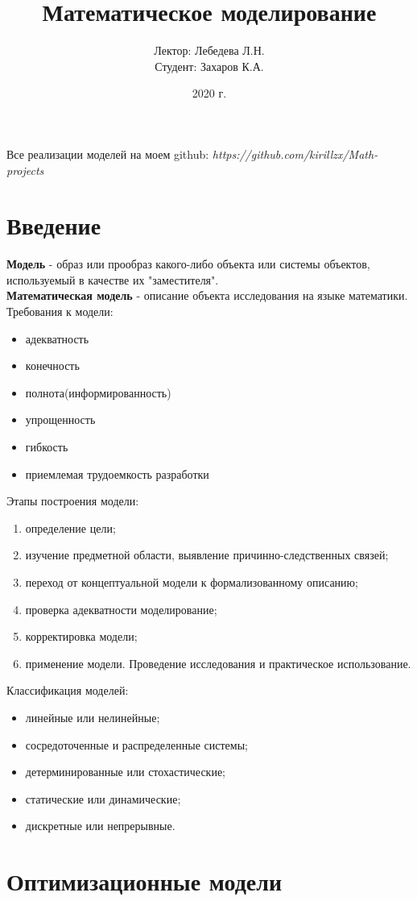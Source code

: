 \documentclass[12pt]{article}
\title{Математическое моделирование}
\author{Лектор: Лебедева Л.Н.\\Студент: Захаров К.А.}
\date{2020 г.}
\theoremstyle{definition}
\theoremstyle{remark}
\begin{document}
\maketitle
Все реализации моделей на моем github: \textit{https://github.com/kirillzx/Math-projects}
\tableofcontents

\section{Введение}
\textbf{Модель} - образ или прообраз какого-либо объекта или системы объектов, используемый в качестве их "заместителя".\\
\textbf{Математическая модель} - описание объекта исследования на языке математики.\\
Требования к модели:
\begin{itemize}
  \item адекватность
  \item конечность
  \item полнота(информированность)
  \item упрощенность
  \item гибкость
  \item приемлемая трудоемкость разработки
\end{itemize}
Этапы построения модели:
\begin{enumerate}
  \item определение цели;
  \item изучение предметной области, выявление причинно-следственных связей;
  \item переход от концептуальной модели к формализованному описанию;
  \item проверка адекватности моделирование;
  \item корректировка модели;
  \item применение модели. Проведение исследования и практическое использование.
\end{enumerate}
Классификация моделей:
\begin{itemize}
  \item линейные или нелинейные;
  \item сосредоточенные и распределенные системы;
  \item детерминированные или стохастические;
  \item статические или динамические;
  \item дискретные или непрерывные.
\end{itemize}





\section{Оптимизационные модели}
\end{document}
